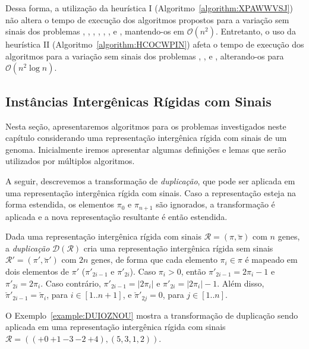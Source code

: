Dessa forma, a utilização da heurística I (Algoritmo~\ref{algorithm:XPAWWVSJ}) não altera o tempo de execução dos algoritmos propostos para a variação sem sinais dos problemas \SbIR{}, \SbIRI{}, \SbIRM{}, \SbIRMI{}, \SbIRT{}, \SbIRTI{}, \SbIRTM{} e \SbIRTMI{}, mantendo-os em $\mathcal{O}(n^2)$. Entretanto, o uso da heurística II (Algoritmo~\ref{algorithm:HCOCWPIN}) afeta o tempo de execução dos algoritmos para a variação sem sinais dos problemas \SbIRM{}, \SbIRMI{}, \SbIRTM{} e \SbIRTMI{}, alterando-os para $\mathcal{O}(n^2 \log n)$.


\subsection{Instâncias Intergênicas Rígidas com Sinais}

Nesta seção, apresentaremos algoritmos para os problemas investigados neste capítulo considerando uma representação intergênica rígida com sinais de um genoma. Inicialmente iremos apresentar algumas definições e lemas que serão utilizados por múltiplos algoritmos.

A seguir, descrevemos a transformação de \emph{duplicação}, que pode ser aplicada em uma representação intergênica rígida com sinais. Caso a representação esteja na forma estendida, os elementos $\pi_0$ e $\pi_{n+1}$ são ignorados, a transformação é aplicada e a nova representação resultante é então estendida.

\begin{definition}
Dada uma representação intergênica rígida com sinais $\mathcal{R}=(\pi,\breve\pi)$ com $n$ genes, a \emph{duplicação} $\mathcal{D}(\mathcal{R})$ cria uma representação intergênica rígida sem sinais $\mathcal{R'}=(\pi',\breve\pi')$ com $2n$ genes, de forma que cada elemento $\pi_i \in \pi$ é mapeado em dois elementos de $\pi'$ ($\pi'_{2i-1}$ e $\pi'_{2i}$). Caso $\pi_i > 0$, então $\pi'_{2i-1} = 2\pi_i-1$ e $\pi'_{2i} = 2\pi_i$. Caso contrário, $\pi'_{2i-1} = |2\pi_i|$ e $\pi'_{2i} = |2\pi_i|-1$. Além disso, $\breve\pi'_{2i-1} = \breve\pi_i$, para $i\in[1..{n+1}]$, e $\breve\pi'_{2j} = 0$, para $j\in[1..n]$.
\end{definition}

O Exemplo~\ref{example:DUIOZNOU} mostra a transformação de duplicação sendo aplicada em uma representação intergênica rígida com sinais $\mathcal{R}=(({+0}~{+1}~{-3}~{-2}~{+4}),(5,3,1,2))$.

